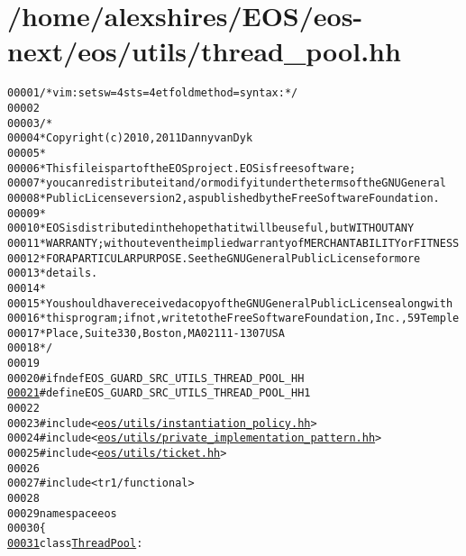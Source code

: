 \hypertarget{thread__pool_8hh_source}{
\section{/home/alexshires/EOS/eos-\/next/eos/utils/thread\_\-pool.hh}
}


\begin{footnotesize}\begin{alltt}
00001 \textcolor{comment}{/* vim: set sw=4 sts=4 et foldmethod=syntax : */}
00002 
00003 \textcolor{comment}{/*}
00004 \textcolor{comment}{ * Copyright (c) 2010, 2011 Danny van Dyk}
00005 \textcolor{comment}{ *}
00006 \textcolor{comment}{ * This file is part of the EOS project. EOS is free software;}
00007 \textcolor{comment}{ * you can redistribute it and/or modify it under the terms of the GNU General}
00008 \textcolor{comment}{ * Public License version 2, as published by the Free Software Foundation.}
00009 \textcolor{comment}{ *}
00010 \textcolor{comment}{ * EOS is distributed in the hope that it will be useful, but WITHOUT ANY}
00011 \textcolor{comment}{ * WARRANTY; without even the implied warranty of MERCHANTABILITY or FITNESS}
00012 \textcolor{comment}{ * FOR A PARTICULAR PURPOSE.  See the GNU General Public License for more}
00013 \textcolor{comment}{ * details.}
00014 \textcolor{comment}{ *}
00015 \textcolor{comment}{ * You should have received a copy of the GNU General Public License along with}
00016 \textcolor{comment}{ * this program; if not, write to the Free Software Foundation, Inc., 59 Temple}
00017 \textcolor{comment}{ * Place, Suite 330, Boston, MA  02111-1307  USA}
00018 \textcolor{comment}{ */}
00019 
00020 \textcolor{preprocessor}{#ifndef EOS\_GUARD\_SRC\_UTILS\_THREAD\_POOL\_HH}
\hypertarget{thread__pool_8hh_source_l00021}{}\hyperlink{thread__pool_8hh_a5a9d11a91405e6ce7d997b9e78f3cc40}{00021} \textcolor{preprocessor}{}\textcolor{preprocessor}{#define EOS\_GUARD\_SRC\_UTILS\_THREAD\_POOL\_HH 1}
00022 \textcolor{preprocessor}{}
00023 \textcolor{preprocessor}{#include <\hyperlink{instantiation__policy_8hh}{eos/utils/instantiation_policy.hh}>}
00024 \textcolor{preprocessor}{#include <\hyperlink{private__implementation__pattern_8hh}{eos/utils/private_implementation_pattern.hh}>}
00025 \textcolor{preprocessor}{#include <\hyperlink{ticket_8hh}{eos/utils/ticket.hh}>}
00026 
00027 \textcolor{preprocessor}{#include <tr1/functional>}
00028 
00029 \textcolor{keyword}{namespace }eos
00030 \{
\hypertarget{thread__pool_8hh_source_l00031}{}\hyperlink{classeos_1_1ThreadPool}{00031}     \textcolor{keyword}{class }\hyperlink{classeos_1_1ThreadPool}{ThreadPool} :

\end{alltt}
\end{footnotesize}
